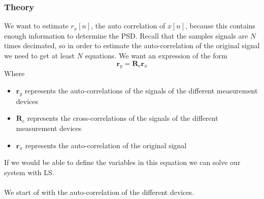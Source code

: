\documentclass[report, oneside, a4paper, openany]{memoir}
\begin{document}
\subsubsection{Theory}
We want to estimate $r_x[n]$, the auto correlation of $x[n]$, because this contains enough information to determine the PSD.
Recall that the samples signals are $N$ times decimated, so in order to estimate the auto-correlation of the original signal we need to get at least $N$ equations. 
We want an expression of the form
$$
\mathbf{r}_y = \mathbf{R}_c\mathbf{r}_x
$$ 
Where
\begin{itemize}
\item $\mathbf{r}_y$ represents the auto-correlations of the signals of the different measurement devices
\item $\mathbf{R}_c$ represents the cross-correlations of the signals of the different measurement devices 
\item $\mathbf{r}_x$ represents the auto-correlation of the original signal
\end{itemize}
If we would be able to define the variables in this equation we can solve our system with LS.\\
\\
We start of with the auto-correlation of the different devices.
\end{document}
